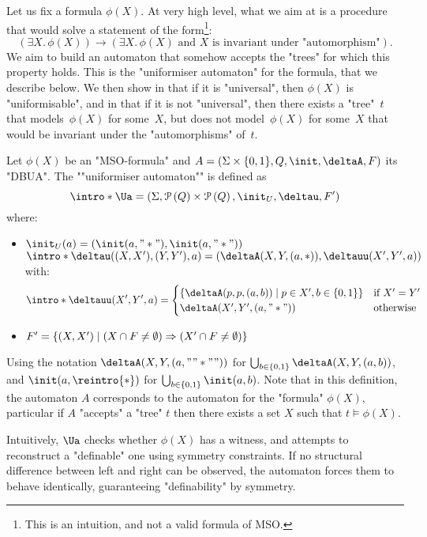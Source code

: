 \documentclass[a4paper,UKenglish,cleveref, autoref, thm-restate]{lipics-v2021}
\begin{document}
Let us fix a formula $\phi(X)$. At very high level, what we aim at is a procedure that would solve a statement of the form\footnote{This is an intuition, and not a valid formula of MSO.}:
\[
	(\exists X.\, \phi(X)) \rightarrow (\exists X.\, \phi(X) \text{ and $X$ is invariant under "automorphism"}).
\]
We aim to build an automaton that somehow accepts the "trees" for which this property holds.
This is the "uniformiser automaton" for the formula, that we describe below. We then show in  that if it is "universal",
then $\phi(X)$ is "uniformisable", and in  that if it is not "universal", then there exists a
"tree"~$t$ that models~$\phi(X)$ for some~$X$, but does not model~$\phi(X)$ for some~$X$ that would be invariant under the "automorphisms" of~$t$.
\begin{definition}
	\AP Let $\phi(X)$ be an "MSO-formula" and $A = (\Sigma \times \{0,1\}, Q, \init, \deltaA, F)$ its "DBUA". The ""uniformiser automaton"" is defined as
	\[
		\intro* \Ua = (\Sigma, \parts{Q} \times \parts{Q}, \init_U, \deltau, F')
	\]
	where:
	\begin{itemize}
		\item $\init_U(a) = (\init(a,"*"), \init(a,"*"))$
		      \itemAP $\intro*\deltau((X,X'),(Y,Y'),a) = (\deltaA(X,Y,(a,*)), \deltauu(X',Y',a))$ with:
		      \[
			      \intro*\deltauu(X',Y',a) = \begin{cases}
				      \setdef{\deltaA(p,p,(a,b))}{p \in X', b \in \set{0,1}} & \text{if } X' = Y' \\
				      \deltaA(X',Y',(a,"*"))                                 & \text{otherwise}
			      \end{cases}
		      \]
		\item $F' = \left\{(X,X') \mid (X \cap F \neq \emptyset) \Rightarrow (X' \cap F \neq \emptyset)\right\}$
	\end{itemize}
	\AP Using the notation $\deltaA(X,Y,(a,""*""))$ for $\bigcup_{b \in \set{0,1}} \deltaA(X,Y,(a,b))$, and $\init(a,\reintro{*})$ for $\bigcup_{b \in \set{0,1}} \init(a,b)$.
	Note that in this definition, the automaton $A$ corresponds to the automaton for the "formula" $\phi(X)$, particular if $A$ "accepts" a "tree" $t$ then
	there exists a set $X$ such that $t \models \phi(X)$.
\end{definition}


Intuitively, $\Ua$ checks whether $\phi(X)$ has a witness, and attempts to reconstruct a "definable" one using symmetry constraints.
If no structural difference between left and right can be observed, the automaton forces them to behave identically, guaranteeing
"definability" by symmetry.
\end{document}
